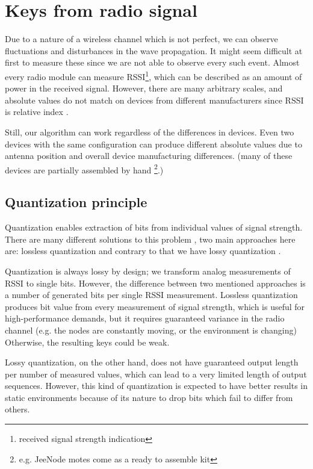 \documentclass[
  print, %
  Table,   %
  nolof,     %
  nolot,     %
           oneside
]{fithesis3}
\begin{document}
  \section{Keys from radio signal}
  Due to a nature of a wireless channel which is not perfect, we can observe fluctuations and disturbances in the wave propagation. It might seem difficult at first to measure these since we are not able to observe every such event. Almost every radio module can measure RSSI\footnote{received signal strength indication}, which can be described as an amount of power in the received signal. However, there are many arbitrary scales, and absolute values do not match on devices from different manufacturers since RSSI is relative index \cite{RSSIMeaning}.

  Still, our algorithm can work regardless of the differences in devices. Even two devices with the same configuration can produce different absolute values due to antenna position and overall device manufacturing differences. (many of these devices are partially assembled by hand \footnote{e.g. JeeNode motes come as a ready to assemble kit}.)

  \subsection{Quantization principle}
    Quantization enables extraction of bits from individual values of signal strength. There are many different solutions to this problem \cite{Jana2009Rssi}, two main approaches here are: lossless quantization \cite{Azimi-Sadjadi2010Fading} and contrary to that we have lossy quantization \cite{Mathur2008Rssi}. %

    Quantization is always lossy by design; we transform analog measurements of RSSI to single bits. However, the difference between two mentioned approaches is a number of generated bits per single RSSI measurement. Lossless quantization produces bit value from every measurement of signal strength, which is useful for high-performance demands, but it requires guaranteed variance in the radio channel (e.g. the nodes are constantly moving, or the environment is changing) Otherwise, the resulting keys could be weak.

    Lossy quantization, on the other hand, does not have guaranteed output length per number of measured values, which can lead to a very limited length of output sequences. However, this kind of quantization is expected to have better results in static environments \cite{Jana2009Rssi} because of its nature to drop bits which fail to differ from others.
\end{document}
